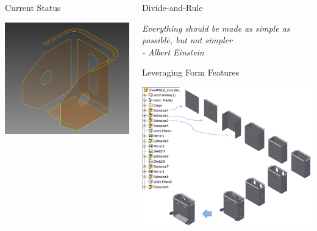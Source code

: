 \documentclass[final]{beamer}
\newlength{\onecolumnwidth}
\begin{document}
\begin{frame}[t]
\begin{columns}[t]
\begin{column}{\onecolumnwidth}
\begin{block}{Current Status}
\begin{center}
			\includegraphics[width=0.65\linewidth]{../Common/images/Inventor_Bracket_MidsBorders.png}
			
		\end{center}
		
	\end{block}
		
			
\end{column}


\begin{column}{\onecolumnwidth} %

		
		
	\begin{alertblock}{Divide-and-Rule}
		\begin{flushright}
			{\em Everything should be made as simple as possible, but not simpler \\- Albert Einstein}
		\end{flushright}
				
	\end{alertblock}
			
	\begin{block}{Leveraging Form Features}

		\centering \includegraphics[height=0.65\linewidth]{../Common/images/USB_buildup}
	

\end{block}
\end{column}
\end{columns}
\end{frame}
\end{document}
